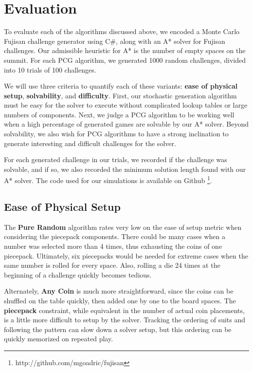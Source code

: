 \documentclass[10pt,journal,compsoc]{IEEEtran}
\begin{document}
\section{Evaluation}

 \noindent
To evaluate each of the algorithms discussed above, we encoded a Monte Carlo Fujisan challenge generator using C\#, along with an A* solver for Fujisan challenges. Our admissible heuristic for A* is the number of empty spaces on the summit. For each PCG algorithm, we generated 1000 random challenges, divided into 10 trials of 100 challenges. 

We will use three criteria to quantify each of these variants:
{\bf ease of physical setup}, {\bf solvability}, and {\bf difficulty}.  First, our stochastic 
generation algorithm must be easy for the solver to execute without complicated lookup tables or large numbers of components. Next, we judge a PCG algorithm to be working well when a high percentage of generated games are solvable by our A* solver. Beyond solvability, we also wish for PCG algorithms to have a strong inclination to generate interesting and difficult challenges for the solver. 

For each generated challenge in our trials, we recorded if the challenge was solvable, and if so, we also recorded the minimum solution length found with our A* solver. The code used for our simulations is available on Github \footnote{http://github.com/mgoadric/fujisan}. 

\subsection{Ease of Physical Setup}

The {\bf Pure Random} algorithm rates very low on the ease of setup metric when considering the piecepack components. There could be many cases when a number was selected more than 4 times, thus exhausting the coins of one piecepack. Ultimately, six piecepacks would be needed for extreme cases when the same number is rolled for every space. Also, rolling a die 24 times at the beginning of a challenge quickly becomes tedious. 

Alternately, {\bf Any Coin} is much more straightforward, since the coins can be shuffled on the table quickly, then added one by one to the board spaces. The {\bf piecepack} constraint, while equivalent in the number of actual coin placements, is a little more difficult to setup by the solver. Tracking the ordering of suits and following the pattern can slow down a solver setup, but this ordering can be quickly memorized on repeated play.
\end{document}
